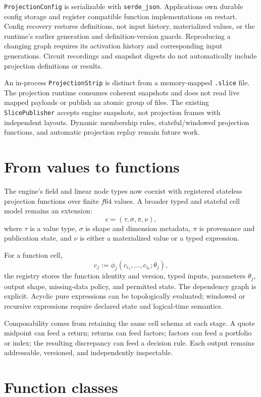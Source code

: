 \documentclass{strategynet-journal}
\begin{document}
\texttt{ProjectionConfig} is serializable with \texttt{serde\_json}.  Applications
own durable config storage and register compatible function implementations on
restart.  Config recovery restores definitions, not input history, materialized
values, or the runtime's earlier generation and definition-version guards.
Reproducing a changing graph requires its activation history and corresponding
input generations.  Circuit recordings and snapshot digests do not automatically
include projection definitions or results.

An in-process \texttt{ProjectionStrip} is distinct from a memory-mapped
\texttt{.slice} file.  The projection runtime consumes coherent snapshots and
does not read live mapped payloads or publish an atomic group of files.
The existing \texttt{SlicePublisher} accepts engine snapshots, not projection
frames with independent layouts.  Dynamic membership rules, stateful/windowed
projection functions, and automatic projection replay remain future work.

\section{From values to functions}

The engine's field and linear node types now coexist with registered stateless
projection functions over finite \(f64\) values.  A broader typed and stateful
cell model remains an extension:
\[
  c=(\tau,\sigma,\pi,\nu),
\]
where \(\tau\) is a value type, \(\sigma\) is shape and dimension metadata,
\(\pi\) is provenance and publication state, and \(\nu\) is either a
materialized value or a typed expression.

For a function cell,
\[
  c_j := \phi_j(c_{i_1},\ldots,c_{i_k};\theta_j),
\]
the registry stores the function identity and version, typed inputs,
parameters \(\theta_j\), output shape, missing-data policy, and permitted
state.  The dependency graph is explicit.  Acyclic pure expressions can be
topologically evaluated; windowed or recursive expressions require declared
state and logical-time semantics.

Composability comes from retaining the same cell schema at each stage.  A
quote midpoint can feed a return; returns can feed factors; factors can feed a
portfolio or index; the resulting discrepancy can feed a decision rule.  Each
output remains addressable, versioned, and independently inspectable.

\section{Function classes}
\end{document}
